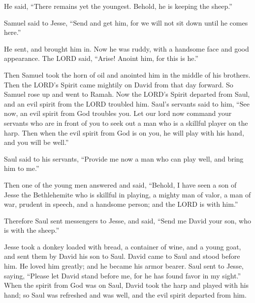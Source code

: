 He said, “There remains yet the youngest. Behold, he is keeping the sheep.”

Samuel said to Jesse, “Send and get him, for we will not sit down until he comes here.”

\myverse{}He sent, and brought him in. Now he was ruddy, with a handsome
face and good appearance. The LORD said, “Arise! Anoint him, for this is he.”

\myverse{}Then Samuel took the horn of oil and anointed him in the middle
of his brothers. Then the LORD’s Spirit came mightily on David from that day forward. So Samuel rose up
and went to Ramah.
\myverse{}Now the LORD’s Spirit departed from Saul, and an evil spirit from the LORD
troubled him.
\myverse{}Saul’s servants said to him, “See now, an evil spirit from God troubles you.
\myverse{}Let our lord now command your servants who are in front of you to seek out
a man who is a skillful player on the harp. Then when the evil spirit from God is on you, he will play
with his hand, and you will be well.”

\myverse{}Saul said to his servants, “Provide me now a man who can play
well, and bring him to me.”

\myverse{}Then one of the young men answered and said, “Behold, I have
seen a son of Jesse the Bethlehemite who is skillful in playing, a mighty man of valor, a man of war,
prudent in speech, and a handsome person; and the LORD is with him.”

\myverse{}Therefore Saul sent messengers to Jesse, and said, “Send me
David your son, who is with the sheep.”

\myverse{}Jesse took a donkey loaded with bread, a container of wine,
and a young goat, and sent them by David his son to Saul.
\myverse{}David came to Saul and stood before him. He loved him greatly; and he became
his armor bearer.
\myverse{}Saul sent to Jesse, saying, “Please let David stand before me, for he has
found favor in my sight.”
\myverse{}When the spirit from God was on Saul, David took the harp and played with
his hand; so Saul was refreshed and was well, and the evil spirit departed from him.


